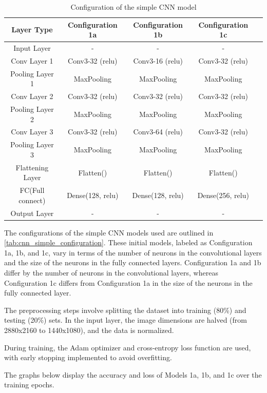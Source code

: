 \begin{table}[H]
\centering
\caption{Configuration of the simple CNN model}
\begin{tabular}{ccccc}
    \toprule
    \textbf{Layer Type} & \textbf{Configuration 1a} & \textbf{Configuration 1b} & \textbf{Configuration 1c} \\
    \midrule
    Input Layer & - & - & - \\
    Conv Layer 1 & Conv3-32 (relu) & Conv3-16 (relu) & Conv3-32 (relu) \\
    Pooling Layer 1 & MaxPooling & MaxPooling& MaxPooling \\
    Conv Layer 2 & Conv3-32 (relu) & Conv3-32 (relu) & Conv3-32 (relu) \\
    Pooling Layer 2 & MaxPooling & MaxPooling& MaxPooling \\
    Conv Layer 3 & Conv3-32 (relu) & Conv3-64 (relu) & Conv3-32 (relu) \\
    Pooling Layer 3 & MaxPooling & MaxPooling& MaxPooling \\
    Flattening Layer & Flatten() & Flatten() & Flatten() \\
    FC(Full connect) & Dense(128, relu) & Dense(128, relu) & Dense(256, relu) \\
    Output Layer & - & - & - \\
    \bottomrule
\end{tabular}
\label{tab:cnn_simple_configuration}
\end{table}

The configurations of the simple CNN models used are outlined in \autoref{tab:cnn_simple_configuration}. These initial models, labeled as Configuration 1a, 1b, and 1c, vary in terms of the number of neurons in the convolutional layers and the size of the neurons in the fully connected layers. Configuration 1a and 1b differ by the number of neurons in the convolutional layers, whereas Configuration 1c differs from Configuration 1a in the size of the neurons in the fully connected layer.

The preprocessing steps involve splitting the dataset into training (80\%) and testing (20\%) sets. In the input layer, the image dimensions are halved (from 2880x2160 to 1440x1080), and the data is normalized.

During training, the Adam optimizer and cross-entropy loss function are used, with early stopping implemented to avoid overfitting.

The graphs below display the accuracy and loss of Models 1a, 1b, and 1c over the training epochs.

